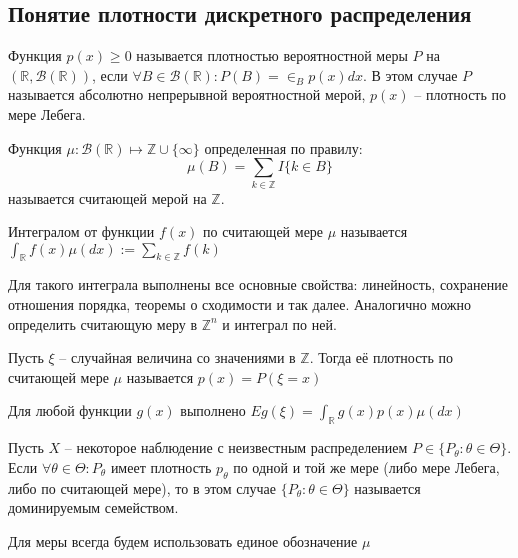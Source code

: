 \documentclass[document.tex]{subfiles}
\begin{document}
\subsection{Понятие плотности дискретного распределения}

Функция $p(x) \geq 0$ называется плотностью вероятностной меры $P$ на $(\mathbb{R}, \mathcal{B}(\mathbb{R}))$, если
$\forall B \in \mathcal{B}(\mathbb{R}): P(B) = \in_{B}p(x)dx$. В этом случае $P$ называется абсолютно непрерывной
вероятностной мерой, $p(x)$ -- плотность по мере Лебега.

\begin{definition}
    Функция $\mu: \mathcal{B}(\mathbb{R}) \mapsto \mathbb{Z} \cup \{\infty\}$ определенная по правилу: 
    \[
        \mu(B) = \sum_{k \in \mathbb{Z}} I\{k \in B\} 
    \] называется считающей мерой на $\mathbb{Z}$.
\end{definition}

\begin{definition}
    Интегралом от функции $f(x)$ по считающей мере $\mu$ называется $\int_{\mathbb{R}} f(x) \mu(dx) := \sum_{k \in
        \mathbb{Z}}f(k)$
\end{definition}
Для такого интеграла выполнены все основные свойства: линейность, сохранение отношения порядка, теоремы о сходимости и
так далее. Аналогично можно определить считающую меру в $\mathbb{Z}^n$ и интеграл по ней.

\begin{definition}
    Пусть $\xi$ -- случайная величина со значениями в $\mathbb{Z}$. Тогда её плотность по считающей мере $\mu$
    называется $p(x) = P(\xi = x)$ 
\end{definition}

\begin{corollary}
    Для любой функции $g(x)$ выполнено $Eg(\xi) = \int_{\mathbb{R}} g(x) p(x) \mu(dx)$
\end{corollary}

\begin{definition}
    Пусть $X$ -- некоторое наблюдение с неизвестным распределением $P \in \{P_{\theta} : \theta \in \Theta\}$. Если
    $\forall \theta \in \Theta: P_{\theta}$ имеет плотность $p_{\theta}$ по одной и той же мере (либо мере Лебега, либо
    по считающей мере), то в этом случае $\{P_{\theta}: \theta \in \Theta\}$ называется доминируемым семейством.
\end{definition}

\begin{remark}
    Для меры всегда будем использовать единое обозначение $\mu$
\end{remark}
\end{document}
